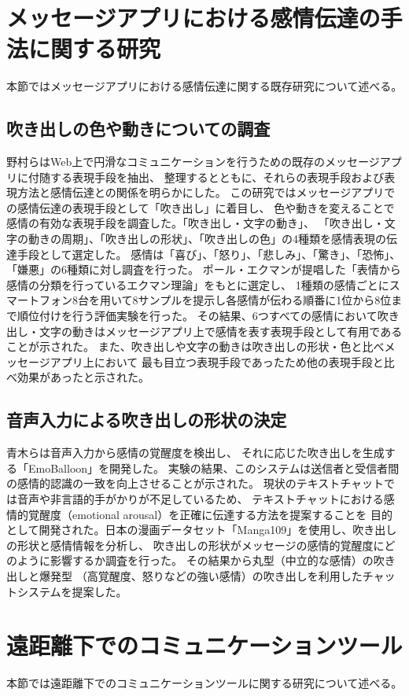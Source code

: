 \documentclass[11pt,a4paper]{ltjsreport}
\begin{document}
\section{メッセージアプリにおける感情伝達の手法に関する研究}
本節ではメッセージアプリにおける感情伝達に関する既存研究について述べる。

\subsection{吹き出しの色や動きについての調査}
野村ら\cite{Thesis2}はWeb上で円滑なコミュニケーションを行うための既存のメッセージアプリに付随する表現手段を抽出、
整理するとともに、それらの表現手段および表現方法と感情伝達との関係を明らかにした。
この研究ではメッセージアプリでの感情伝達の表現手段として「吹き出し」に着目し、
色や動きを変えることで感情の有効な表現手段を調査した。「吹き出し・文字の動き」、
「吹き出し・文字の動きの周期」、「吹き出しの形状」、「吹き出しの色」の4種類を感情表現の伝達手段として選定した。
感情は「喜び」、「怒り」、「悲しみ」、「驚き」、「恐怖」、「嫌悪」の6種類に対し調査を行った。
ポール・エクマンが提唱した「表情から感情の分類を行っているエクマン理論」をもとに選定し、
1種類の感情ごとにスマートフォン8台を用いて8サンプルを提示し各感情が伝わる順番に1位から8位まで順位付けを行う評価実験を行った。
その結果、6つすべての感情において吹き出し・文字の動きはメッセージアプリ上で感情を表す表現手段として有用であることが示された。
また、吹き出しや文字の動きは吹き出しの形状・色と比べメッセージアプリ上において
最も目立つ表現手段であったため他の表現手段と比べ効果があったと示された。

\subsection{音声入力による吹き出しの形状の決定}
青木ら\cite{Thesis2}は音声入力から感情の覚醒度を検出し、
それに応じた吹き出しを生成する「EmoBalloon」を開発した。
実験の結果、このシステムは送信者と受信者間の感情的認識の一致を向上させることが示された。
現状のテキストチャットでは音声や非言語的手がかりが不足しているため、
テキストチャットにおける感情的覚醒度（emotional arousal）を正確に伝達する方法を提案することを
目的として開発された。日本の漫画データセット「Manga109」を使用し、吹き出しの形状と感情情報を分析し、
吹き出しの形状がメッセージの感情的覚醒度にどのように影響するか調査を行った。
その結果から丸型（中立的な感情）の吹き出しと爆発型
（高覚醒度、怒りなどの強い感情）の吹き出しを利用したチャットシステムを提案した。


\section{遠距離下でのコミュニケーションツール}
本節では遠距離下でのコミュニケーションツールに関する研究について述べる。
\end{document}
